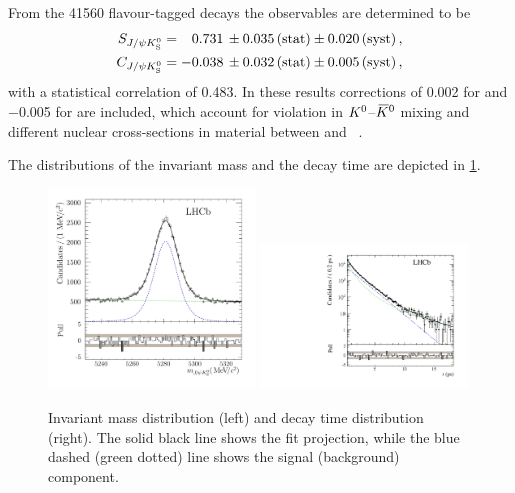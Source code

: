 From the \num{41560} flavour-tagged \BdToJPsiKS decays the \CP observables are determined to be
\begin{align*}
  S_{J/\psi{\ensuremath{{K}^0_{\mathrm{ \scriptscriptstyle S}}}}} &=  \phantom{-}0.731 \, \pm 0.035 \, \text{(stat)} \pm 0.020 \, \text{(syst)}\,, \\
  C_{J/\psi{\ensuremath{{K}^0_{\mathrm{ \scriptscriptstyle S}}}}} &=  			- 0.038 \, \pm 0.032 \, \text{(stat)} \pm 0.005 \, \text{(syst)}\,,
\end{align*}
with a statistical correlation of \num{0.483}. In these results corrections of
\num{+0.002} for \SJpsiKS and \num{-0.005} for \CJpsiKS are included, which
account for \CP violation in ${{K}^0}$--${{\kern 0.2em\overline{\kern -0.2em K}{}}{}^0}$ mixing and different nuclear
cross-sections in material between \Kz and
\Kzb~\cite{Fetscher:1996fa,*Ko:2010mk}.

The distributions of the invariant mass and the decay time are depicted in
\cref{fig:bd2jpsiks:nominalfit:mass_and_time}.

\begin{figure}[htb]
\includegraphics[width=0.49\textwidth]{06-Bd2JpsiKS/tikz/pdf/MassPulls_summed.pdf}
\includegraphics[width=0.49\textwidth]{06-Bd2JpsiKS/figs/obsTime_summed_pull_log.pdf}
\caption{
Invariant mass distribution (left) and decay time distribution (right). The solid black line
shows the fit projection, while the blue dashed (green dotted) line shows the
signal (background) component.}
\label{fig:bd2jpsiks:nominalfit:mass_and_time}
\end{figure}
